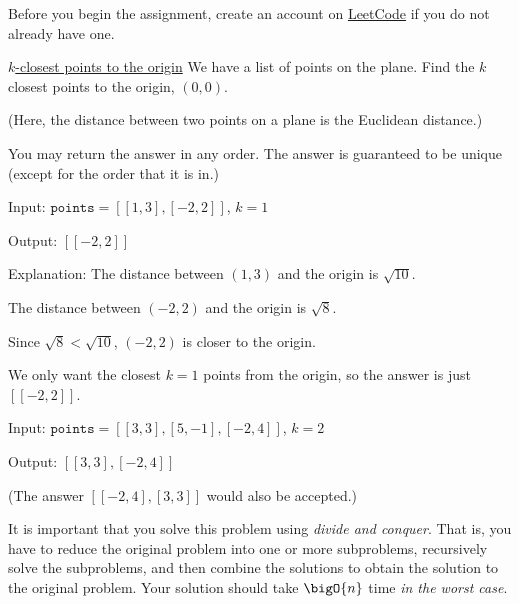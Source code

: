 \documentclass[draft]{article}
\begin{document}
\begin{titlepage}
    Before you begin the assignment, create an account on \href{https://leetcode.com/}{LeetCode} if you do not already have one.

    \begin{problem}{\href{https://leetcode.com/problems/k-closest-points-to-origin/}{$k$-closest points to the origin}}{}
    We have a list of points on the plane.  Find the $k$ closest points to the origin, $(0, 0)$.

    (Here, the distance between two points on a plane is the Euclidean distance.)

    You may return the answer in any order. The answer is guaranteed to be unique (except for the order that it is in.)
    \end{problem}

    \begin{example}{}{}
        Input: $\texttt{points} = [[1,3],[-2,2]]$, $k = 1$

        Output: $[[-2,2]]$

        Explanation:
        The distance between $(1, 3)$ and the origin is $\sqrt{10}$.

        The distance between $(-2, 2)$ and the origin is $\sqrt{8}$.

        Since $\sqrt{8} < \sqrt{10}$, $(-2, 2)$ is closer to the origin.

        We only want the closest $k = 1$ points from the origin, so the answer is just $[[-2,2]]$.
    \end{example}

    \begin{example}{}{}
        Input: $\texttt{points} = [[3,3],[5,-1],[-2,4]]$, $k = 2$

        Output: $[[3,3],[-2,4]]$

        (The answer $[[-2,4],[3,3]]$ would also be accepted.)
    \end{example}

    It is important that you solve this problem using \emph{divide and conquer}. That is, you have to reduce the original problem into one or more subproblems, recursively solve the subproblems, and then combine the solutions to obtain the solution to the original problem. Your solution should take $\bigO{n}$ time \emph{in the worst case}. %


\end{titlepage}
\end{document}
